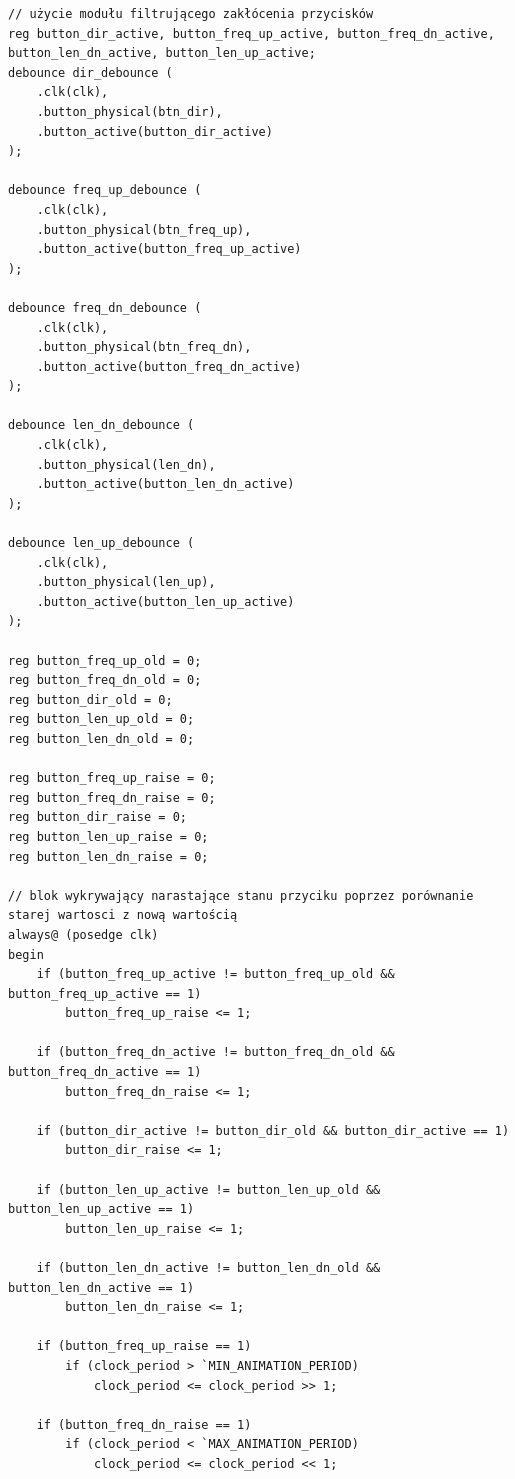 \documentclass[a4paper]{article}
\begin{document}
\begin{verbatim}
// użycie modułu filtrującego zakłócenia przycisków
reg button_dir_active, button_freq_up_active, button_freq_dn_active, button_len_dn_active, button_len_up_active;
debounce dir_debounce ( 
    .clk(clk),
    .button_physical(btn_dir),
    .button_active(button_dir_active)
);

debounce freq_up_debounce ( 
    .clk(clk),
    .button_physical(btn_freq_up),
    .button_active(button_freq_up_active)
);

debounce freq_dn_debounce ( 
    .clk(clk),
    .button_physical(btn_freq_dn),
    .button_active(button_freq_dn_active)
);

debounce len_dn_debounce ( 
    .clk(clk),
    .button_physical(len_dn),
    .button_active(button_len_dn_active)
);

debounce len_up_debounce ( 
    .clk(clk),
    .button_physical(len_up),
    .button_active(button_len_up_active)
);

reg button_freq_up_old = 0;
reg button_freq_dn_old = 0;
reg button_dir_old = 0;
reg button_len_up_old = 0;
reg button_len_dn_old = 0;

reg button_freq_up_raise = 0;
reg button_freq_dn_raise = 0;
reg button_dir_raise = 0;
reg button_len_up_raise = 0;
reg button_len_dn_raise = 0;

// blok wykrywający narastające stanu przyciku poprzez porównanie starej wartosci z nową wartością
always@ (posedge clk)
begin
    if (button_freq_up_active != button_freq_up_old && button_freq_up_active == 1)
        button_freq_up_raise <= 1;
        
    if (button_freq_dn_active != button_freq_dn_old && button_freq_dn_active == 1)
        button_freq_dn_raise <= 1;
        
    if (button_dir_active != button_dir_old && button_dir_active == 1)
        button_dir_raise <= 1;
        
    if (button_len_up_active != button_len_up_old && button_len_up_active == 1)
        button_len_up_raise <= 1;
        
    if (button_len_dn_active != button_len_dn_old && button_len_dn_active == 1)
        button_len_dn_raise <= 1;
       
    if (button_freq_up_raise == 1)
        if (clock_period > `MIN_ANIMATION_PERIOD)
            clock_period <= clock_period >> 1;
       
    if (button_freq_dn_raise == 1)
        if (clock_period < `MAX_ANIMATION_PERIOD) 
            clock_period <= clock_period << 1;
        

\end{verbatim}
\end{document}
